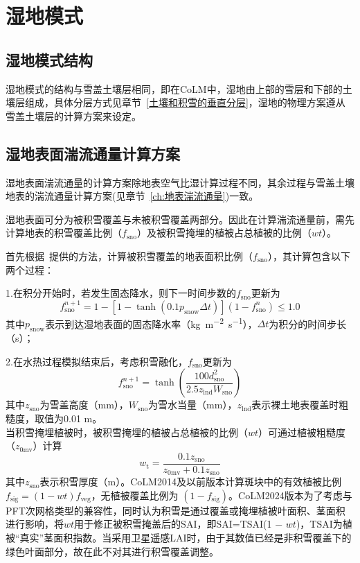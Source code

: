 \chapter{湿地模式}

\section{湿地模式结构}
湿地模式的结构与雪盖土壤层相同，即在CoLM中，湿地由上部的雪层和下部的土壤层组成，具体分层方式见章节~\ref{土壤和积雪的垂直分层}，湿地的物理方案遵从雪盖土壤层的计算方案来设定。

\section{湿地表面湍流通量计算方案}
湿地表面湍流通量的计算方案除地表空气比湿计算过程不同，其余过程与雪盖土壤地表的湍流通量计算方案(见章节~\ref{ch:地表湍流通量})一致。

湿地表面可分为被积雪覆盖与未被积雪覆盖两部分。因此在计算湍流通量前，需先计算地表的积雪覆盖比例（$f_{\mathrm{sno}}$）及被积雪掩埋的植被占总植被的比例（$wt$）。

首先根据~\citet{swenson2012new}提供的方法，计算被积雪覆盖的地表面积比例（$f_{\mathrm{sno}}$），其计算包含以下两个过程：

1.在积分开始时，若发生固态降水，则下一时间步数的$f_{\mathrm{sno}}$更新为
\begin{equation}
  f^{n+1}_{\mathrm{sno}}=1-\left[1-\tanh{\left(0.1 p_{\mathrm {snow}}  \Delta t\right)}\right]\left(1-f^n_{\mathrm{sno}}\right) \leqslant 1.0
\end{equation}
其中$p_{\mathrm {snow}} $表示到达湿地表面的固态降水率（\unit{kg.m^{-2}.s^{-1}}），$\Delta t$为积分的时间步长（s）；

2.在水热过程模拟结束后，考虑积雪融化，$f_{\mathrm{sno}}$更新为
\begin{equation}
  f^{n+1}_{\mathrm{sno}}=\tanh \left(\frac{100 d^2_{\mathrm{sno}}}{2.5z_{\mathrm{lnd}} W_{\mathrm{sno}}}\right)
\end{equation}
其中$z_{\mathrm{sno}}$为雪盖高度（mm），$W_{\mathrm{sno}}$为雪水当量（mm），$z_{\mathrm{lnd}}$表示裸土地表覆盖时粗糙度，取值为0.01 m。\\

当积雪掩埋植被时，被积雪掩埋的植被占总植被的比例（$wt$）可通过植被粗糙度（$z_{\mathrm{0mv}}$）计算
\begin{equation}
  w_{\mathrm {t}} =\frac{0.1 z_{\mathrm{sno}}}{z_{\mathrm{0mv}}+0.1 z_{\mathrm{sno}}}
\end{equation}
其中$z_{\mathrm{sno}}$表示积雪厚度（m）。CoLM2014及以前版本计算斑块中的有效植被比例$f_{\mathrm{sig}} =
(1 −wt)f_{\mathrm{veg}}$，无植被覆盖比例为 $(1−f_{\mathrm{sig}})$。CoLM2024版本为了考虑与PFT次网格类型的兼容性，同时认为积雪是通过覆盖或掩埋植被叶面积、茎面积进行影响，将$wt$用于修正被积雪掩盖后的SAI，即SAI=TSAI(1 − $wt$)，TSAI为植被“真实”茎面积指数。当采用卫星遥感LAI时，由于其数值已经是非积雪覆盖下的绿色叶面部分，故在此不对其进行积雪覆盖调整。\\

